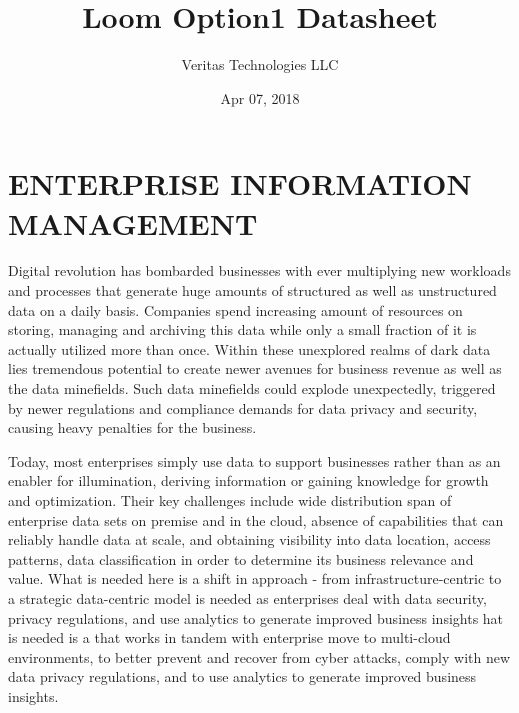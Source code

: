 \documentclass[letterpaper,10pt,english]{sphinxhowto}
\title{Loom Option1 Datasheet}
\date{Apr 07, 2018}
\author{Veritas Technologies LLC}
\begin{document}
\maketitle
\sphinxtableofcontents
{}\label{\detokenize{col/ds/mcdmp_ds_opt1::doc}}


\begin{figure}[htbp]
\centering

\noindent{}
\end{figure}


\section{ENTERPRISE INFORMATION MANAGEMENT}
\label{\detokenize{col/ds/mcdmp_ds_opt1:title-ds-option1}}\label{\detokenize{col/ds/mcdmp_ds_opt1:enterprise-information-management}}\label{\detokenize{col/ds/mcdmp_ds_opt1:mcdmp-ds-opt1}}\label{\detokenize{col/ds/mcdmp_ds_opt1:datasheet-loom-the-multi-cloud-enterprise-data-management-platform-ecosystem-opt1}}
Digital revolution has bombarded businesses with ever multiplying new workloads and processes that generate huge amounts of structured as well as unstructured data on a daily basis. Companies spend increasing amount of resources on storing, managing and archiving this data while only a small fraction of it is actually utilized more than once. Within these unexplored realms of dark data lies tremendous potential to create newer avenues for business revenue as well as the data minefields. Such data minefields could explode unexpectedly, triggered by newer regulations and compliance demands for data privacy and security, causing heavy penalties for the business.

Today, most enterprises simply use data to support businesses rather than as an enabler for illumination, deriving information or gaining knowledge for growth and optimization. Their key challenges include wide distribution span of enterprise data sets on premise and in the cloud, absence of capabilities that can reliably handle data at scale, and obtaining visibility into data location, access patterns, data classification in order to determine its business relevance and value. What is needed here is a shift in approach - from infrastructure-centric to a strategic data-centric model is needed as enterprises deal with data security, privacy regulations, and use analytics to generate improved business insights hat is needed is a that works in tandem with enterprise move to multi-cloud environments, to better prevent and recover from cyber attacks, comply with new data privacy regulations, and to use analytics to generate improved business insights.
\end{document}

